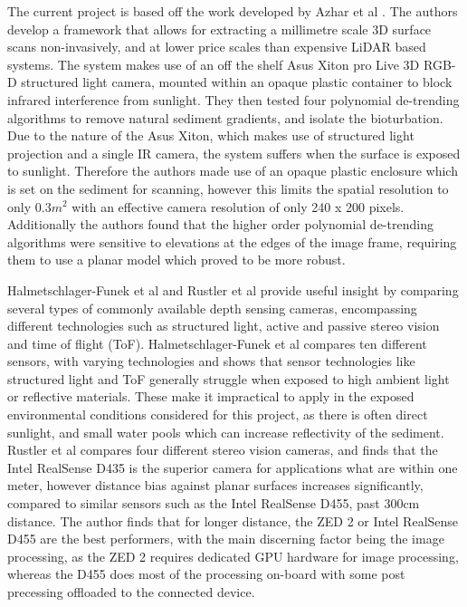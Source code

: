  The current project is based off the work developed by Azhar et al \cite{azharRGBDFrameworkCapturing2022}. The authors develop a framework that allows for extracting a millimetre scale 3D surface scans non-invasively, and at lower price scales than expensive LiDAR based systems. The system makes use of an off the shelf Asus Xiton pro Live 3D RGB-D structured light camera, mounted within an opaque plastic container to block infrared interference from sunlight. They then tested four polynomial de-trending algorithms to remove natural sediment gradients, and isolate the bioturbation. Due to the nature of the Asus Xiton, which makes use of structured light projection and a single IR camera, the system suffers when the surface is exposed to sunlight. Therefore the authors made use of an opaque plastic enclosure which is set on the sediment for scanning, however this limits the spatial resolution to only $0.3m^2$ with an effective camera resolution of only 240 x 200 pixels. Additionally the authors found that the higher order polynomial de-trending algorithms were sensitive to elevations at the edges of the image frame, requiring them to use a planar model which proved to be more robust.
 
 Halmetschlager-Funek et al \cite{halmetschlager-funekEmpiricalEvaluationTen2019} and Rustler et al \cite{rustlerEmpiricalComparisonFour2025} provide useful insight by comparing several types of commonly available depth sensing cameras, encompassing different technologies such as structured light, active and passive stereo vision and time of flight (ToF). Halmetschlager-Funek et al \cite{halmetschlager-funekEmpiricalEvaluationTen2019} compares ten different sensors, with varying technologies and shows that sensor technologies like structured light and ToF generally struggle when exposed to high ambient light or reflective materials. These make it impractical to apply in the exposed environmental conditions considered for this project, as there is often direct sunlight, and small water pools which can increase reflectivity of the sediment. Rustler et al \cite{rustlerEmpiricalComparisonFour2025} compares four different stereo vision cameras, and finds that the Intel RealSense D435 is the superior camera for applications what are within one meter, however distance bias against planar surfaces increases significantly, compared to similar sensors such as the Intel RealSense D455, past 300cm distance. The author finds that for longer distance, the ZED 2 or Intel RealSense D455 are the best performers, with the main discerning factor being the image processing, as the ZED 2 requires dedicated GPU hardware for image processing, whereas the D455 does most of the processing on-board with some post precessing offloaded to the connected device.
 
